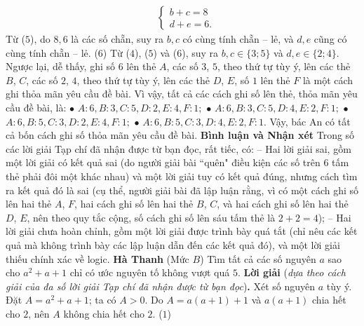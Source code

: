 \begin{multicols}{2}
\begin{align*}
		&\begin{cases}
			b + c = 8\\[-0.6ex]
			d + e = 6.
		\end{cases} \tag{$5$}
	\end{align*}
	Từ ($5$), do $8, 6$ là các số chẵn, suy ra $b, c$ có cùng tính chẵn -- lẻ, và $d, e$ cũng có cùng tính chẵn -- lẻ.  \hfill ($6$)
	\vskip 0.05cm
	Từ ($4$), ($5$) và ($6$), suy ra $b, c \in \{3; 5\}$ và $d, e \in \{2; 4\}$.
	\vskip 0.05cm
	Ngược lại, dễ thấy, ghi số $6$ lên thẻ $A$, các số $3$, $5$, theo thứ tự tùy ý, lên các thẻ $B$, $C$, các số $2$, $4$, theo thứ tự tùy ý, lên các thẻ $D$, $E$, số $1$ lên thẻ $F$ là một cách ghi thỏa mãn yêu cầu đề bài.
	\vskip 0.05cm
	Vì vậy, tất cả các cách ghi số lên thẻ, thỏa mãn yêu cầu đề bài, là:
	\vskip 0.05cm
	$\bullet$ $A: 6, B: 3, C: 5, D: 2, E: 4, F: 1;$
	\vskip 0.05cm
	$\bullet$ $A: 6, B: 3, C: 5, D: 4, E: 2, F: 1;$
	\vskip 0.05cm
	$\bullet$ $A: 6, B: 5, C: 3, D: 2, E: 4, F: 1;$
	\vskip 0.05cm
	$\bullet$ $A: 6, B: 5, C: 3, D: 4, E: 2, F: 1.$
	\vskip 0.05cm
	Vậy, bác An có tất cả bốn cách ghi số thỏa mãn yêu cầu đề bài.
	\vskip 0.05cm
	\textbf{\color{thachthuctoanhoc}Bình luận và Nhận xét}
	\vskip 0.05cm	
	Trong số các lời giải Tạp chí đã nhận được từ bạn đọc, rất tiếc, có:
	\vskip 0.05cm
	-- Hai lời giải sai, gồm một lời giải có kết quả sai (do người giải bài ``quên" điều kiện các số trên $6$ tấm thẻ phải đôi một khác nhau) và một lời giải tuy có kết quả đúng, nhưng cách tìm ra kết quả đó là sai (cụ thể, người giải bài đã lập luận rằng, vì có một cách ghi số lên hai thẻ $A$, $F$, hai cách ghi số lên hai thẻ $B$, $C$, và hai cách ghi số lên hai thẻ $D$, $E$, nên theo quy tắc cộng, số cách ghi số lên sáu tấm thẻ là $2 + 2 = 4$);
	\vskip 0.05cm
	-- Hai lời giải chưa hoàn chỉnh, gồm một lời giải được trình bày quá tắt (chỉ nêu các kết quả mà không trình bày các lập luận dẫn đến các kết quả đó), và một lời giải thiếu chính xác về logic.
	\vskip 0.05cm
	\hfill	\textbf{\color{thachthuctoanhoc}Hà Thanh}
	\vskip 0.05cm
	{}
	(Mức $B$) Tìm tất cả các số nguyên $a$ sao cho $a^2+a+1$ chỉ có ước nguyên tố không vượt quá $5$. 
	\vskip 0.05cm
	\textbf{\color{thachthuctoanhoc}Lời giải} (\textit{dựa theo cách giải của đa số lời giải Tạp chí đã nhận được từ bạn đọc})\textbf{\color{thachthuctoanhoc}.}
	\vskip 0.05cm
	Xét số nguyên $a$ tùy ý.
	\vskip 0.05cm
	Đặt $A = a^2 + a + 1$; ta có $A >0$.
	\vskip 0.05cm 
	Do $A = a(a+1) + 1$  và $a(a + 1)$ chia hết cho $2$, nên $A$ không chia hết cho $2$.      \hfill ($1$)
	\vskip 0.05cm

\end{multicols}
